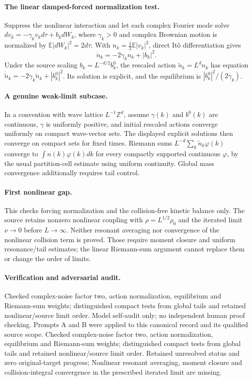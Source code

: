 \documentclass[11pt]{article}
\begin{document}
\paragraph{The linear damped-forced normalization test.} Suppress the nonlinear interaction and let each complex Fourier mode solve $dv_k=-\gamma_kv_kd\tau+b_kdW_k$, where $\gamma_k>0$ and complex Brownian motion is normalized by $\mathbb E|dW_k|^2=2d\tau$. With $n_k=\frac12\mathbb E|v_k|^2$, direct Itô differentiation gives
\[
 \dot n_k=-2\gamma_kn_k+|b_k|^2.
\]
Under the source scaling $b_k=L^{-d/2}b_k^0$, the rescaled action $\widetilde n_k=L^dn_k$ has equation $\dot{\widetilde n}_k=-2\gamma_k\widetilde n_k+|b_k^0|^2$. Its solution is explicit, and the equilibrium is $|b_k^0|^2/(2\gamma_k)$.

\paragraph{A genuine weak-limit subcase.} In a convention with wave lattice $L^{-1}\mathbb Z^d$, assume $\gamma(k)$ and $b^0(k)$ are continuous, $\gamma$ is uniformly positive, and initial rescaled actions converge uniformly on compact wave-vector sets. The displayed explicit solutions then converge on compact sets for fixed times. Riemann sums $L^{-d}\sum_k\widetilde n_k\varphi(k)$ converge to $\int n(k)\varphi(k)dk$ for every compactly supported continuous $\varphi$, by the usual partition-cell estimate using uniform continuity. Global mass convergence additionally requires tail control.

\paragraph{First nonlinear gap.} This checks forcing normalization and the collision-free kinetic balance only. The source retains nonzero nonlinear coupling with $\rho=L^{1/2}\rho_0$ and the iterated limit $\nu\to0$ before $L\to\infty$. Neither resonant averaging nor convergence of the nonlinear collision term is proved. Those require moment closure and uniform resonance/tail estimates; the linear Riemann-sum argument cannot replace them or change the order of limits.

\paragraph{Verification and adversarial audit.}
Checked complex-noise factor two, action normalization, equilibrium and Riemann-sum weights; distinguished compact tests from global tails and retained nonlinear/source limit order. Model self-audit only; no independent human proof checking. Prompts A and B were applied to this canonical record and its qualified source scope. Checked complex-noise factor two, action normalization, equilibrium and Riemann-sum weights; distinguished compact tests from global tails and retained nonlinear/source limit order. Retained unresolved status and zero original-target progress; Nonlinear resonant averaging, moment closure and collision-integral convergence in the prescribed iterated limit are missing.
\end{document}
